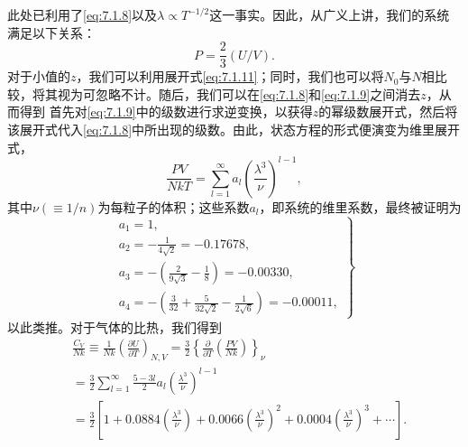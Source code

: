 此处已利用了\autoref{eq:7.1.8}以及\(\lambda \propto T^{-1/2}\)这一事实。因此，从广义上讲，我们的系统满足以下关系：
\begin{equation}\tag{7.1.13}\label{eq:7.1.13}
P = \frac { 2 } { 3 } ( U / V ) .
\end{equation}
对于小值的\(z\)，我们可以利用展开式\autoref{eq:7.1.11}；同时，我们也可以将\(N_0\)与\(N\)相比较，将其视为可忽略不计。随后，我们可以在\autoref{eq:7.1.8}和\autoref{eq:7.1.9}之间消去\(z\)，从而得到
首先对\autoref{eq:7.1.9}中的级数进行求逆变换，以获得\(z\)的幂级数展开式，然后将该展开式代入\autoref{eq:7.1.8}中所出现的级数。由此，状态方程的形式便演变为维里展开式，
\begin{equation}\tag{7.1.14}\label{eq:7.1.14}
\frac { P V } { N k T } = \sum _ { l = 1 } ^{\infty} a _ { l } \left( \frac { \lambda ^{3} } { \nu } \right) ^{l - 1} ,
\end{equation}
其中\(\nu(\equiv 1/n)\)为每粒子的体积；这些系数\(a_{l}\)，即系统的维里系数，最终被证明为
\begin{equation}\tag{7.1.15}\label{eq:7.1.15}
\left. \begin{array}{l} { { a _ { 1 } = 1 , } } \\{ { a _ { 2 } = - \frac { 1 } { 4 \sqrt { 2 } } = - 0 . 17 67 8 , } } \\{ { a _ { 3 } = - \left( \frac { 2 } { 9 \sqrt { 3 } } - \frac { 1 } { 8 } \right) = - 0 . 00 33 0 , } } \\{ { a _ { 4 } = - \left( \frac { 3 } { 32 } + \frac { 5 } { 32 \sqrt { 2 } } - \frac { 1 } { 2 \sqrt { 6 } } \right) = - 0 . 00 01 1 , } } \end{array} \right\}
\end{equation}
以此类推。对于气体的比热，我们得到
\begin{equation}\tag{7.1.16}\label{eq:7.1.16}
\begin{array}{rl} & { \frac { C _ { V } } { N k } \equiv \frac { 1 } { N k } \left( \frac { \partial U } { \partial T } \right) _ { N , V } = \frac { 3 } { 2 } \left\{ \frac { \partial } { \partial T } \left( \frac { P V } { N k } \right) \right\} _ { \nu } } \\& {  = \frac { 3 } { 2 } \sum _ { l = 1 } ^{\infty} \frac { 5 - 3 l } { 2 } a _ { l } \left( \frac { \lambda ^{3} } { \nu } \right) ^{l - 1} } \\& {  = \frac { 3 } { 2 } \left[ 1 + 0 . 08 84 \left( \frac { \lambda ^{3} } { \nu } \right) + 0 . 00 66 \left( \frac { \lambda ^{3} } { \nu } \right) ^{2} + 0 . 00 04 \left( \frac { \lambda ^{3} } { \nu } \right) ^{3} + \cdots \right] . } \end{array}
\end{equation}
